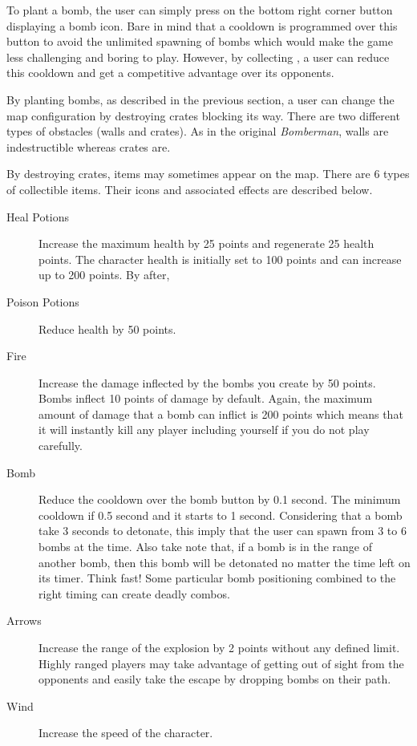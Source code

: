 To plant a bomb, the user can simply press on the bottom right corner button displaying a bomb icon. Bare in mind that a cooldown is programmed over this button to avoid the unlimited spawning of bombs which would make the game less challenging and boring to play. However, by collecting , a user can reduce this cooldown and get a competitive advantage over its opponents.

By planting bombs, as described in the previous section, a user can change the map configuration by destroying crates blocking its way. There are two different types of obstacles (walls and crates). As in the original \textit{Bomberman}, walls are indestructible whereas crates are.

By destroying crates, items may sometimes appear on the map. There are 6 types of collectible items. Their icons and associated effects are described below.
\begin{description}
\item [Heal Potions] Increase the maximum health by 25 points and regenerate 25 health points. The character health is initially set to 100 points and can increase up to 200 points. By after,
\item [Poison Potions] Reduce health by 50 points.
\item [Fire] Increase the damage inflected by the bombs you create by 50 points. Bombs inflect 10 points of damage by default. Again, the maximum amount of damage that a bomb can inflict is 200 points which means that it will instantly kill any player including yourself if you do not play carefully.
\item [Bomb] Reduce the cooldown over the bomb button by 0.1 second. The minimum cooldown if 0.5 second and it starts to 1 second. Considering that a bomb take 3 seconds to detonate, this imply that the user can spawn from 3 to 6 bombs at the time. Also take note that, if a bomb is in the range of another bomb, then this bomb will be detonated no matter the time left on its timer. Think fast! Some particular bomb positioning combined to the right timing can create deadly combos.
\item [Arrows] Increase the range of the explosion by 2 points without any defined limit. Highly ranged players may take advantage of getting out of sight from the opponents and easily take the escape by dropping bombs on their path.
\item [Wind] Increase the speed of the character.
\end{description}
